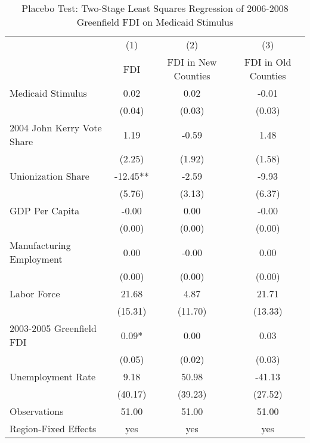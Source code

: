 \begin{table}[!htbp]\centering
\def\sym#1{\ifmmode^{#1}\else\(^{#1}\)\fi}
\caption{Placebo Test: Two-Stage Least Squares Regression of 2006-2008 Greenfield FDI on Medicaid Stimulus}
\begin{tabular}{l*{3}{c}}
\hline\hline
                    &\multicolumn{1}{c}{(1)}   &\multicolumn{1}{c}{(2)}   &\multicolumn{1}{c}{(3)}   \\
                    &         FDI   &FDI in New Counties   &FDI in Old Counties   \\
\hline
Medicaid Stimulus   &        0.02   &        0.02   &       -0.01   \\
                    &      (0.04)   &      (0.03)   &      (0.03)   \\
2004 John Kerry Vote Share&        1.19   &       -0.59   &        1.48   \\
                    &      (2.25)   &      (1.92)   &      (1.58)   \\
Unionization Share  &      -12.45** &       -2.59   &       -9.93   \\
                    &      (5.76)   &      (3.13)   &      (6.37)   \\
GDP Per Capita      &       -0.00   &        0.00   &       -0.00   \\
                    &      (0.00)   &      (0.00)   &      (0.00)   \\
Manufacturing Employment&        0.00   &       -0.00   &        0.00   \\
                    &      (0.00)   &      (0.00)   &      (0.00)   \\
Labor Force         &       21.68   &        4.87   &       21.71   \\
                    &     (15.31)   &     (11.70)   &     (13.33)   \\
2003-2005 Greenfield FDI&        0.09*  &        0.00   &        0.03   \\
                    &      (0.05)   &      (0.02)   &      (0.03)   \\
Unemployment Rate   &        9.18   &       50.98   &      -41.13   \\
                    &     (40.17)   &     (39.23)   &     (27.52)   \\
\hline
Observations        &       51.00   &       51.00   &       51.00   \\
Region-Fixed Effects&         yes   &         yes   &         yes   \\
\hline\hline

\end{tabular}
\end{table}
